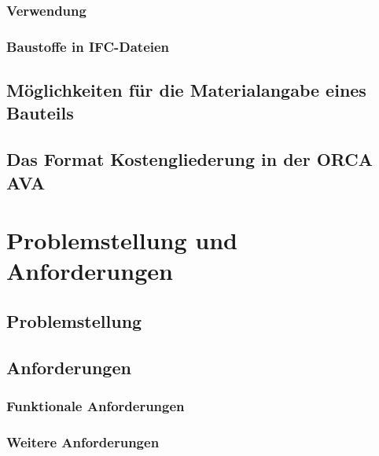 \subsubsection{Verwendung}
\subsubsection{Baustoffe in IFC-Dateien}
\subsection{Möglichkeiten für die  Materialangabe eines Bauteils}
\subsection{Das Format Kostengliederung in der ORCA AVA}

\section{Problemstellung und Anforderungen}
\subsection{Problemstellung}
\subsection{Anforderungen}
\subsubsection{Funktionale Anforderungen}
\subsubsection{Weitere Anforderungen}
